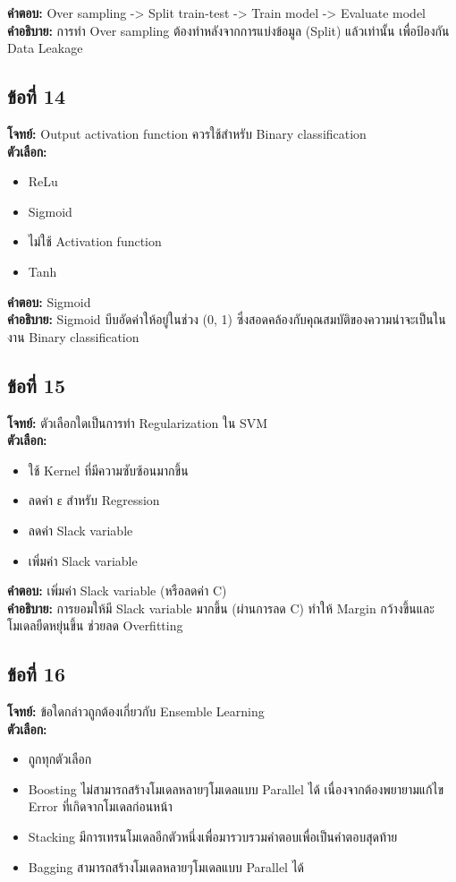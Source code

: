 \documentclass[12pt]{article}
\begin{document}
\textbf{คำตอบ:} Over sampling -> Split train-test -> Train model -> Evaluate model\\
\textbf{คำอธิบาย:} การทำ Over sampling ต้องทำหลังจากการแบ่งข้อมูล (Split) แล้วเท่านั้น เพื่อป้องกัน Data Leakage

\subsection*{ข้อที่ 14}
\textbf{โจทย์:} Output activation function ควรใช้สำหรับ Binary classification\\
\textbf{ตัวเลือก:}
\begin{itemize}
    \item ReLu
    \item Sigmoid
    \item ไม่ใช้ Activation function
    \item Tanh
\end{itemize}

\textbf{คำตอบ:} Sigmoid\\
\textbf{คำอธิบาย:} Sigmoid บีบอัดค่าให้อยู่ในช่วง (0, 1) ซึ่งสอดคล้องกับคุณสมบัติของความน่าจะเป็นในงาน Binary classification

\subsection*{ข้อที่ 15}
\textbf{โจทย์:} ตัวเลือกใดเป็นการทำ Regularization ใน SVM\\
\textbf{ตัวเลือก:}
\begin{itemize}
    \item ใช้ Kernel ที่มีความซับซ้อนมากขึ้น
    \item ลดค่า ε สำหรับ Regression
    \item ลดค่า Slack variable
    \item เพิ่มค่า Slack variable
\end{itemize}

\textbf{คำตอบ:} เพิ่มค่า Slack variable (หรือลดค่า C)\\
\textbf{คำอธิบาย:} การยอมให้มี Slack variable มากขึ้น (ผ่านการลด C) ทำให้ Margin กว้างขึ้นและโมเดลยืดหยุ่นขึ้น ช่วยลด Overfitting

\subsection*{ข้อที่ 16}
\textbf{โจทย์:} ข้อใดกล่าวถูกต้องเกี่ยวกับ Ensemble Learning\\
\textbf{ตัวเลือก:}
\begin{itemize}
    \item ถูกทุกตัวเลือก
    \item Boosting ไม่สามารถสร้างโมเดลหลายๆโมเดลแบบ Parallel ได้ เนื่องจากต้องพยายามแก้ไข Error ที่เกิดจากโมเดลก่อนหน้า
    \item Stacking มีการเทรนโมเดลอีกตัวหนึ่งเพื่อมารวบรวมคำตอบเพื่อเป็นคำตอบสุดท้าย
    \item Bagging สามารถสร้างโมเดลหลายๆโมเดลแบบ Parallel ได้
\end{itemize}
\end{document}
